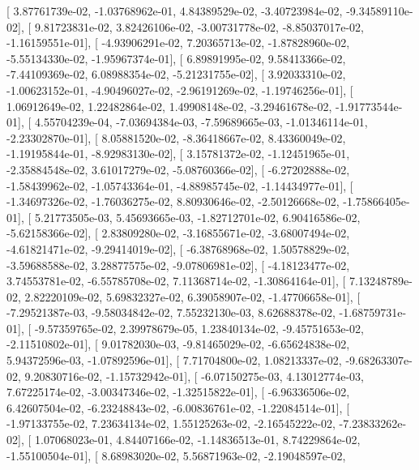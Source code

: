 \documentclass{article}
\begin{document}
       [  3.87761739e-02,  -1.03768962e-01,   4.84389529e-02,
         -3.40723984e-02,  -9.34589110e-02],
       [  9.81723831e-02,   3.82426106e-02,  -3.00731778e-02,
         -8.85037017e-02,  -1.16159551e-01],
       [ -4.93906291e-02,   7.20365713e-02,  -1.87828960e-02,
         -5.55134330e-02,  -1.95967374e-01],
       [  6.89891995e-02,   9.58413366e-02,  -7.44109369e-02,
          6.08988354e-02,  -5.21231755e-02],
       [  3.92033310e-02,  -1.00623152e-01,  -4.90496027e-02,
         -2.96191269e-02,  -1.19746256e-01],
       [  1.06912649e-02,   1.22482864e-02,   1.49908148e-02,
         -3.29461678e-02,  -1.91773544e-01],
       [  4.55704239e-04,  -7.03694384e-03,  -7.59689665e-03,
         -1.01346114e-01,  -2.23302870e-01],
       [  8.05881520e-02,  -8.36418667e-02,   8.43360049e-02,
         -1.19195844e-01,  -8.92983130e-02],
       [  3.15781372e-02,  -1.12451965e-01,  -2.35884548e-02,
          3.61017279e-02,  -5.08760366e-02],
       [ -6.27202888e-02,  -1.58439962e-02,  -1.05743364e-01,
         -4.88985745e-02,  -1.14434977e-01],
       [ -1.34697326e-02,  -1.76036275e-02,   8.80930646e-02,
         -2.50126668e-02,  -1.75866405e-01],
       [  5.21773505e-03,   5.45693665e-03,  -1.82712701e-02,
          6.90416586e-02,  -5.62158366e-02],
       [  2.83809280e-02,  -3.16855671e-02,  -3.68007494e-02,
         -4.61821471e-02,  -9.29414019e-02],
       [ -6.38768968e-02,   1.50578829e-02,  -3.59688588e-02,
          3.28877575e-02,  -9.07806981e-02],
       [ -4.18123477e-02,   3.74553781e-02,  -6.55785708e-02,
          7.11368714e-02,  -1.30864164e-01],
       [  7.13248789e-02,   2.82220109e-02,   5.69832327e-02,
          6.39058907e-02,  -1.47706658e-01],
       [ -7.29521387e-03,  -9.58034842e-02,   7.55232130e-03,
          8.62688378e-02,  -1.68759731e-01],
       [ -9.57359765e-02,   2.39978679e-05,   1.23840134e-02,
         -9.45751653e-02,  -2.11510802e-01],
       [  9.01782030e-03,  -9.81465029e-02,  -6.65624838e-02,
          5.94372596e-03,  -1.07892596e-01],
       [  7.71704800e-02,   1.08213337e-02,  -9.68263307e-02,
          9.20830716e-02,  -1.15732942e-01],
       [ -6.07150275e-03,   4.13012774e-03,   7.67225174e-02,
         -3.00347346e-02,  -1.32515822e-01],
       [ -6.96336506e-02,   6.42607504e-02,  -6.23248843e-02,
         -6.00836761e-02,  -1.22084514e-01],
       [ -1.97133755e-02,   7.23634134e-02,   1.55125263e-02,
         -2.16545222e-02,  -7.23833262e-02],
       [  1.07068023e-01,   4.84407166e-02,  -1.14836513e-01,
          8.74229864e-02,  -1.55100504e-01],
       [  8.68983020e-02,   5.56871963e-02,  -2.19048597e-02,
\end{document}
